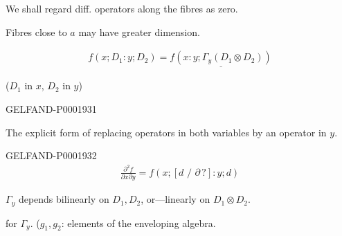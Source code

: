 We shall regard diff. operators along the fibres as zero.

Fibres close to $a$ may have greater dimension.



\begin{gather*}
f (x; D_1: y; D_2)=\underline{f (x: y;\Gamma_y (D_1\otimes D_2))}
\end{gather*}



($D_1$ in $x$, $D_2$ in $y$)



\begin{GelfandAdjacentEvidence}{GELFAND-P000193}{1}
\begin{center}
\end{center}
\end{GelfandAdjacentEvidence}

\par\noindent\begin{minipage}{\linewidth}
The explicit form of replacing operators in both variables by an operator
in $y$.



\begin{GelfandAdjacentEvidence}{GELFAND-P000193}{2}
\begin{gather*}
\frac{\partial^2 f}{\partial x\partial y}=f (x; [d\text{ / }\partial\,?]: y; d)
\end{gather*}
\end{GelfandAdjacentEvidence}
\end{minipage}\par


$\Gamma_y$ depends bilinearly on $D_1, D_2$, or—linearly on $D_1\otimes D_2$.





 for $\Gamma_y$. ($g_1, g_2$: elements of the enveloping algebra.



